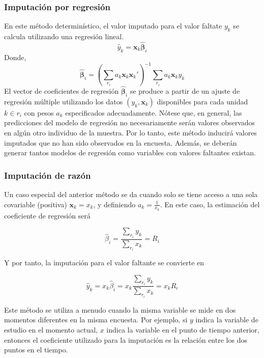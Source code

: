 \documentclass[12pt,spanish,]{book}
\begin{document}
\hypertarget{imputacion-por-regresion}{%
\subsubsection*{Imputación por regresión}\label{imputacion-por-regresion}}

En este método determinístico, el valor imputado para el valor faltate \(y_k\) se calcula utilizando una regresión lineal.
\[\hat{y}_k = \mathbf{x}_k \hat{\boldsymbol{\beta}}_i\]
Donde,
\[
\hat{\boldsymbol{\beta}}_i = (\sum_{r_i} a_k\mathbf{x}_k\mathbf{x}_k')^{-1}
\sum_{r_i} a_k\mathbf{x}_ky_k
\]
El vector de coeficientes de regresión \(\hat{\boldsymbol{\beta}}_i\) se produce a partir de un ajuste de regresión múltiple utilizando los datos \((y_k, \mathbf{x}_k)\) disponibles para cada unidad \(k \in r_i\) con pesos \(a_k\) especificados adecuadamente. Nótese que, en general, las predicciones del modelo de regresión no necesariamente serán valores observados en algún otro individuo de la muestra. Por lo tanto, este método inducirá valores imputados que no han sido observados en la encuesta. Además, se deberán generar tantos modelos de regresión como variables con valores faltantes existan.

\hypertarget{imputacion-de-razon}{%
\subsubsection*{Imputación de razón}\label{imputacion-de-razon}}

Un caso especial del anterior método se da cuando solo se tiene acceso a una sola covariable (positiva) \(\mathbf{x}_k = x_k\), y definiendo \(a_k = \frac{1}{x_k}\). En este caso, la estimación del coeficiente de regresión será

\[
\hat{{\beta}}_i = \frac{\sum_{r_i}y_k}{\sum_{r_i}x_k} = R_i
\]

Y por tanto, la imputación para el valor faltante se convierte en

\[\hat{y}_k = x_k \hat{\beta}_i = x_k \frac{\sum_{r_i}y_k}{\sum_{r_i}x_k} = x_k R_i\]

Este método se utiliza a menudo cuando la misma variable se mide en dos momentos diferentes en la misma encuesta. Por ejemplo, si \(y\) indica la variable de estudio en el momento actual, \(x\) indica la variable en el punto de tiempo anterior, entonces el coeficiente utilizado para la imputación es la relación entre los dos puntos en el tiempo.
\end{document}
